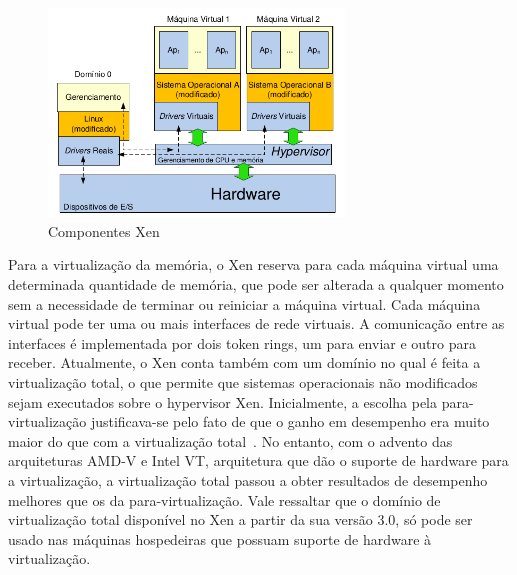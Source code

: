 \begin{figure}
	\begin{center}
    	\includegraphics[width=0.7\textwidth]{ComponentesXen}
    \end{center}
    \caption{Componentes Xen~\cite{ferrazani}}
    \label{fig:ComponentesXen}

\end{figure}


Para a virtualização da memória, o Xen reserva para cada máquina virtual uma
determinada quantidade de memória, que pode ser alterada a qualquer momento sem a necessidade
de terminar ou reiniciar a máquina virtual. Cada máquina virtual pode ter uma ou mais interfaces de
rede virtuais. A comunicação entre as interfaces é implementada por dois token rings, um para
enviar e outro para receber.
Atualmente, o Xen conta também com um domínio no qual é feita a virtualização total, o
que permite que sistemas operacionais não modificados sejam executados sobre o hypervisor Xen.
Inicialmente, a escolha pela para-virtualização justificava-se pelo fato de que o ganho em
desempenho era muito maior do que com a virtualização total~\cite{ferrazani}. No entanto, com o advento das
arquiteturas AMD-V e Intel VT, arquitetura que dão o suporte de hardware para a virtualização, a
virtualização total passou a obter resultados de desempenho melhores que os da para-virtualização.
Vale ressaltar que o domínio de virtualização total disponível no Xen a partir da sua versão 3.0, só
pode ser usado nas máquinas hospedeiras que possuam suporte de hardware à virtualização.

